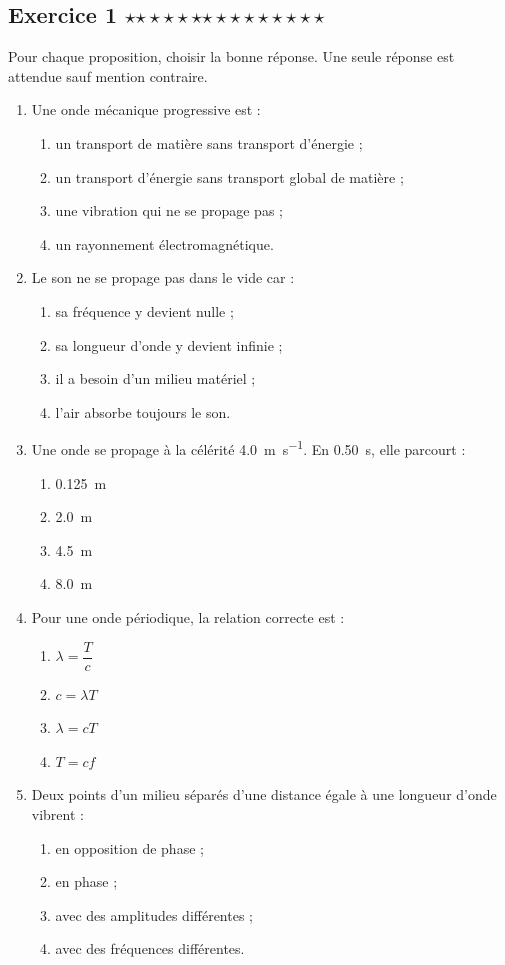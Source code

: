 \documentclass[11pt,a4paper]{article}
\newcommand{\etoiles}[1]{%
\ifcase#1\or $\star$\or $\star\star$\or $\star\star\star$\or $\star\star\star\star$\or $\star\star\star\star\star$\fi}
\newcommand{\exostar}[2]{\subsection*{Exercice #1 \hfill \etoiles{#2}}}
\begin{document}
\exostar{1}{1}
Pour chaque proposition, choisir la bonne réponse. Une seule réponse est attendue sauf mention contraire.

\begin{enumerate}[label=\textbf{Q\arabic*.},leftmargin=1.1cm]
\item Une onde mécanique progressive est :
\begin{enumerate}[label=\alph*)]
    \item un transport de matière sans transport d'énergie ;
    \item un transport d'énergie sans transport global de matière ;
    \item une vibration qui ne se propage pas ;
    \item un rayonnement électromagnétique.
\end{enumerate}

\item Le son ne se propage pas dans le vide car :
\begin{enumerate}[label=\alph*)]
    \item sa fréquence y devient nulle ;
    \item sa longueur d'onde y devient infinie ;
    \item il a besoin d'un milieu matériel ;
    \item l'air absorbe toujours le son.
\end{enumerate}

\item Une onde se propage à la célérité \SI{4,0}{m.s^{-1}}. En \SI{0,50}{s}, elle parcourt :
\begin{enumerate}[label=\alph*)]
    \item \SI{0,125}{m}
    \item \SI{2,0}{m}
    \item \SI{4,5}{m}
    \item \SI{8,0}{m}
\end{enumerate}

\item Pour une onde périodique, la relation correcte est :
\begin{enumerate}[label=\alph*)]
    \item $\lambda = \dfrac{T}{c}$
    \item $c = \lambda T$
    \item $\lambda = cT$
    \item $T = c f$
\end{enumerate}

\item Deux points d'un milieu séparés d'une distance égale à une longueur d'onde vibrent :
\begin{enumerate}[label=\alph*)]
    \item en opposition de phase ;
    \item en phase ;
    \item avec des amplitudes différentes ;
    \item avec des fréquences différentes.
\end{enumerate}


\end{enumerate}
\end{document}
